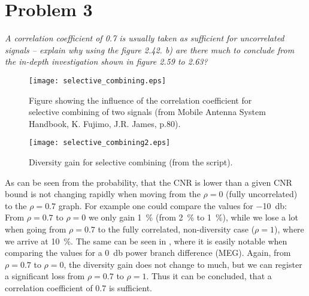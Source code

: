 \section{Problem 3}
\textit{A correlation coefficient of 0.7 is usually taken as sufficient for uncorrelated signals – explain why using the figure 2.42. b) are there much to conclude from the in-depth investigation shown in figure 2.59 to 2.63?}\\

\begin{figure}[!h]
  \centering
  \texttt{[image: selective\_combining.eps]}
  \caption{Figure showing the influence of the correlation coefficient for selective combining of two signals (from Mobile Antenna System Handbook, K. Fujimo, J.R. James, p.80).}
  \label{fig:selective_combining}
\end{figure}

\begin{figure}[!h]
  \centering
  \texttt{[image: selective\_combining2.eps]}
  \caption{Diversity gain for selective combining (from the script).}
  \label{fig:selective_combining2}
\end{figure}

As can be seen from  the probability, that the CNR is lower than a given CNR bound is not changing rapidly when moving from the $\rho=0$ (fully uncorrelated) to the $\rho=0.7$ graph. For example one could compare the values for \SI{-10}{\decibel}: From $\rho=0.7$ to $\rho=0$ we only gain \SI{1}{\percent} (from \SI{2}{\percent} to \SI{1}{\percent}), while we lose a lot when going from $\rho=0.7$ to the fully correlated, non-diversity case ($\rho=1$), where we arrive at \SI{10}{\percent}. The same can be seen in , where it is easily notable when comparing the values for a \SI{0}{\decibel} power branch difference (MEG). Again, from $\rho=0.7$ to $\rho=0$, the diversity gain does not change to much, but we can register a significant loss from $\rho=0.7$ to $\rho=1$. Thus it can be concluded, that a correlation coefficient of 0.7 is sufficient.